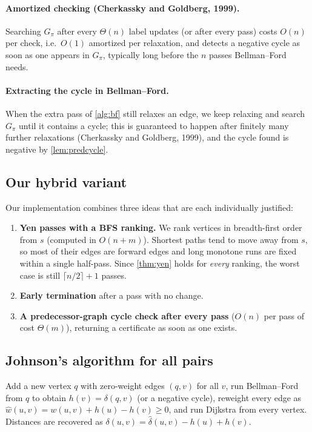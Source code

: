 \documentclass[11pt,a4paper]{article}
\theoremstyle{definition}
\newcommand{\pred}{\pi}
\begin{document}
\paragraph{Amortized checking (Cherkassky and Goldberg, 1999).} Searching $G_\pred$ after every $\Theta(n)$ label updates (or after every pass) costs $O(n)$ per check, i.e.\ $O(1)$ amortized per relaxation, and detects a negative cycle as soon as one appears in $G_\pred$, typically long before the $n$ passes Bellman--Ford needs.

\paragraph{Extracting the cycle in Bellman--Ford.} When the extra pass of \cref{alg:bf} still relaxes an edge, we keep relaxing and search $G_\pred$ until it contains a cycle; this is guaranteed to happen after finitely many further relaxations (Cherkassky and Goldberg, 1999), and the cycle found is negative by \cref{lem:predcycle}.

\subsection{Our hybrid variant}

Our implementation combines three ideas that are each individually justified:
\begin{enumerate}
\item \textbf{Yen passes with a BFS ranking.} We rank vertices in breadth-first order from $s$ (computed in $O(n+m)$). Shortest paths tend to move away from $s$, so most of their edges are forward edges and long monotone runs are fixed within a single half-pass. Since \cref{thm:yen} holds for \emph{every} ranking, the worst case is still $\lceil n/2\rceil+1$ passes.
\item \textbf{Early termination} after a pass with no change.
\item \textbf{A predecessor-graph cycle check after every pass} ($O(n)$ per pass of cost $\Theta(m)$), returning a certificate as soon as one exists.
\end{enumerate}

\subsection{Johnson's algorithm for all pairs}

Add a new vertex $q$ with zero-weight edges $(q,v)$ for all $v$, run Bellman--Ford from $q$ to obtain $h(v)=\delta(q,v)$ (or a negative cycle), reweight every edge as $\hat w(u,v)=w(u,v)+h(u)-h(v)\ge 0$, and run Dijkstra from every vertex. Distances are recovered as $\delta(u,v)=\hat\delta(u,v)-h(u)+h(v)$.
\end{document}
